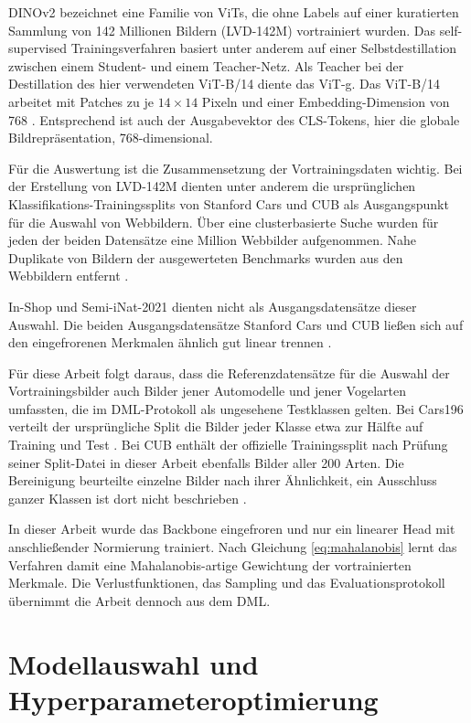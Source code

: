 DINOv2 bezeichnet eine Familie von \acp{ViT}, die ohne Labels auf einer kuratierten Sammlung von 142 Millionen Bildern (LVD-142M) vortrainiert wurden. Das self-supervised Trainingsverfahren basiert unter anderem auf einer Selbstdestillation zwischen einem Student- und einem Teacher-Netz. Als Teacher bei der Destillation des hier verwendeten ViT-B/14 diente das ViT-g. Das ViT-B/14 arbeitet mit Patches zu je $14\times14$ Pixeln und einer Embedding-Dimension von 768 \cite{oquab_dinov2_2023}. Entsprechend ist auch der Ausgabevektor des \ac{CLS}-Tokens, hier die globale Bildrepräsentation, 768-dimensional.
 
Für die Auswertung ist die Zusammensetzung der Vortrainingsdaten wichtig. Bei der Erstellung von LVD-142M dienten unter anderem die ursprünglichen Klassifikations-Trainingssplits von Stanford Cars und \ac{CUB} als Ausgangspunkt für die Auswahl von Webbildern. Über eine clusterbasierte Suche wurden für jeden der beiden Datensätze eine Million Webbilder aufgenommen. Nahe Duplikate von Bildern der ausgewerteten Benchmarks wurden aus den Webbildern entfernt \cite{oquab_dinov2_2023}.

In-Shop und Semi-iNat-2021 dienten nicht als Ausgangsdatensätze dieser Auswahl. Die beiden Ausgangsdatensätze Stanford Cars und \ac{CUB} ließen sich auf den eingefrorenen Merkmalen ähnlich gut linear trennen \cite{oquab_dinov2_2023}.

Für diese Arbeit folgt daraus, dass die Referenzdatensätze für die Auswahl der Vortrainingsbilder auch Bilder jener Automodelle und jener Vogelarten umfassten, die im \ac{DML}-Protokoll als ungesehene Testklassen gelten. Bei Cars196 verteilt der ursprüngliche Split die Bilder jeder Klasse etwa zur Hälfte auf Training und Test \cite{krause_3d_2013}. Bei \ac{CUB} enthält der offizielle Trainingssplit nach Prüfung seiner Split-Datei in dieser Arbeit ebenfalls Bilder aller 200 Arten. Die Bereinigung beurteilte einzelne Bilder nach ihrer Ähnlichkeit, ein Ausschluss ganzer Klassen ist dort nicht beschrieben \cite{oquab_dinov2_2023}.

In dieser Arbeit wurde das Backbone eingefroren und nur ein linearer Head mit anschließender Normierung trainiert. Nach Gleichung \eqref{eq:mahalanobis} lernt das Verfahren damit eine Mahalanobis-artige Gewichtung der vortrainierten Merkmale. Die Verlustfunktionen, das Sampling und das Evaluationsprotokoll übernimmt die Arbeit dennoch aus dem \ac{DML}.

\section{Modellauswahl und Hyperparameteroptimierung}
\label{sec:modellauswahl}

